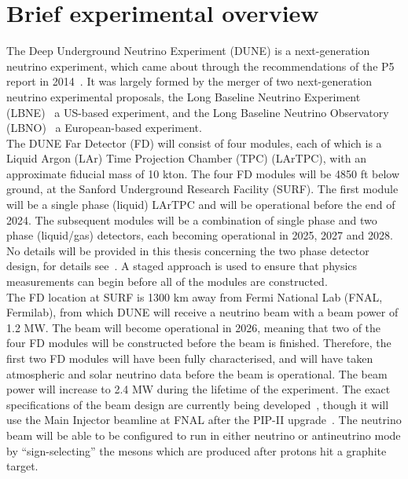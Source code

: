 \section{Brief experimental overview} \label{sec:DUNEOverview}
The Deep Underground Neutrino Experiment (DUNE) is a next-generation neutrino experiment, which came about through the recommendations of the P5 report in 2014~\citep{P5Doc}. It was largely formed by the merger of two next-generation neutrino experimental proposals, the Long Baseline Neutrino Experiment (LBNE)~\citep{LBNE_CDR1, LBNE_CDR2, LBNE_CDR3, LBNE_CDR4, LBNE_CDR5, LBNE_CDR6} a US-based experiment, and the Long Baseline Neutrino Observatory (LBNO)~\citep{LBNO_EOI} a European-based experiment. \\

The DUNE Far Detector (FD) will consist of four modules, each of which is a Liquid Argon (LAr) Time Projection Chamber (TPC) (LArTPC), with an approximate fiducial mass of 10 kton. The four FD modules will be 4850 ft below ground, at the Sanford Underground Research Facility (SURF). The first module will be a single phase (liquid) LArTPC and will be operational before the end of 2024. The subsequent modules will be a combination of single phase and two phase (liquid/gas) detectors, each becoming operational in 2025, 2027 and 2028. No details will be provided in this thesis concerning the two phase detector design, for details see~\citep{DUNECDR_V4}. A staged approach is used to ensure that physics measurements can begin before all of the modules are constructed. \\

The FD location at SURF is 1300 km away from Fermi National Lab (FNAL, Fermilab), from which DUNE will receive a neutrino beam with a beam power of 1.2 MW. The beam will become operational in 2026, meaning that two of the four FD modules will be constructed before the beam is finished. Therefore, the first two FD modules will have been fully characterised, and will have taken atmospheric and solar neutrino data before the beam is operational. The beam power will increase to 2.4 MW during the lifetime of the experiment. The exact specifications of the beam design are currently being developed~\citep{DUNECDR_V3}, though it will use the Main Injector beamline at FNAL after the PIP-II upgrade~\citep{PIP-II}. The neutrino beam will be able to be configured to run in either neutrino or antineutrino mode by ``sign-selecting'' the mesons which are produced after protons hit a graphite target. \\

